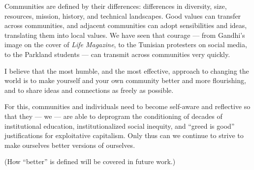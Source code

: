 Communities are defined by their differences: differences in diversity, size, resources, mission, history, and technical landscapes. Good values can transfer across communities, and adjacent communities can adopt sensibilities and ideas, translating them into local values. We have seen that courage --- from Gandhi's image on the cover of \emph{Life Magazine}, to the Tunisian protesters on social media, to the Parkland students --- can transmit across communities very quickly.

I believe that the most humble, and the most effective, approach to changing the world is to make yourself and your own community better and more flourishing, and to share ideas and connections as freely as possible.

For this, communities and individuals need to become self-aware and reflective so that they --- we --- are able to deprogram the conditioning of decades of institutional education, institutionalized social inequity, and ``greed is good'' justifications for exploitative capitalism. Only thus can we continue to strive to make ourselves better versions of ourselves. 

(How ``better'' is defined will be covered in future work.)
